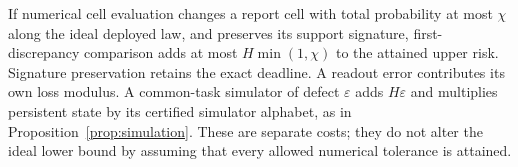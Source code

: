 If numerical cell evaluation changes a report cell with total probability at most $\chi$ along the ideal deployed law, and preserves its support signature, first-discrepancy comparison adds at most $H\min(1,\chi)$ to the attained upper risk. Signature preservation retains the exact deadline. A readout error contributes its own loss modulus. A common-task simulator of defect $\varepsilon$ adds $H\varepsilon$ and multiplies persistent state by its certified simulator alphabet, as in Proposition~\ref{prop:simulation}. These are separate costs; they do not alter the ideal lower bound by assuming that every allowed numerical tolerance is attained.
